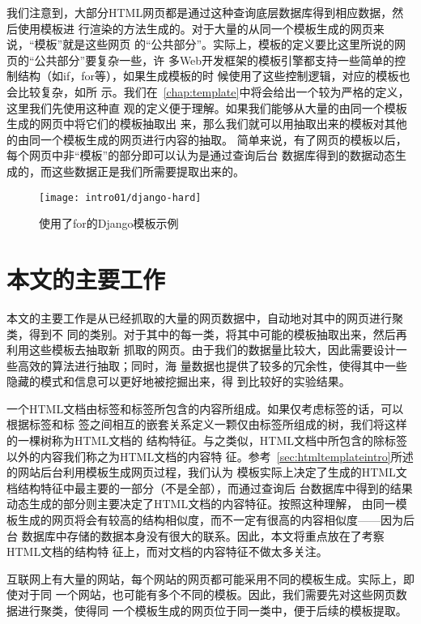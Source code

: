 我们注意到，大部分HTML网页都是通过这种查询底层数据库得到相应数据，然后使用模板进
行渲染的方法生成的。对于大量的从同一个模板生成的网页来说，“模板”就是这些网页
的“公共部分”。实际上，模板的定义要比这里所说的网页的“公共部分”要复杂一些，许
多Web开发框架的模板引擎都支持一些简单的控制结构（如if，for等），如果生成模板的时
候使用了这些控制逻辑，对应的模板也会比较复杂，如所
示。我们在~\ref{chap:template}中将会给出一个较为严格的定义，这里我们先使用这种直
观的定义便于理解。如果我们能够从大量的由同一个模板生成的网页中将它们的模板抽取出
来，那么我们就可以用抽取出来的模板对其他的由同一个模板生成的网页进行内容的抽取。
简单来说，有了网页的模板以后，每个网页中非“模板”的部分即可以认为是通过查询后台
数据库得到的数据动态生成的，而这些数据正是我们所需要提取出来的。
\begin{figure}
  \centering
  \texttt{[image: intro01/django-hard]}
  \caption{使用了for的Django模板示例}
  \label{intro:fig:django-hard}
\end{figure}
\section{本文的主要工作}
\label{sec:mainwork}
本文的主要工作是从已经抓取的大量的网页数据中，自动地对其中的网页进行聚类，得到不
同的类别。对于其中的每一类，将其中可能的模板抽取出来，然后再利用这些模板去抽取新
抓取的网页。由于我们的数据量比较大，因此需要设计一些高效的算法进行抽取；同时，海
量数据也提供了较多的冗余性，使得其中一些隐藏的模式和信息可以更好地被挖掘出来，得
到比较好的实验结果。

一个HTML文档由标签和标签所包含的内容所组成。如果仅考虑标签的话，可以根据标签和标
签之间相互的嵌套关系定义一颗仅由标签所组成的树，我们将这样的一棵树称为HTML文档的
结构特征。与之类似，HTML文档中所包含的除标签以外的内容我们称之为HTML文档的内容特
征。参考~\ref{sec:htmltemplateintro}所述的网站后台利用模板生成网页过程，我们认为
模板实际上决定了生成的HTML文档结构特征中最主要的一部分（不是全部），而通过查询后
台数据库中得到的结果动态生成的部分则主要决定了HTML文档的内容特征。按照这种理解，
由同一模板生成的网页将会有较高的结构相似度，而不一定有很高的内容相似度——因为后台
数据库中存储的数据本身没有很大的联系。因此，本文将重点放在了考察HTML文档的结构特
征上，而对文档的内容特征不做太多关注。

互联网上有大量的网站，每个网站的网页都可能采用不同的模板生成。实际上，即使对于同
一个网站，也可能有多个不同的模板。因此，我们需要先对这些网页数据进行聚类，使得同
一个模板生成的网页位于同一类中，便于后续的模板提取。

